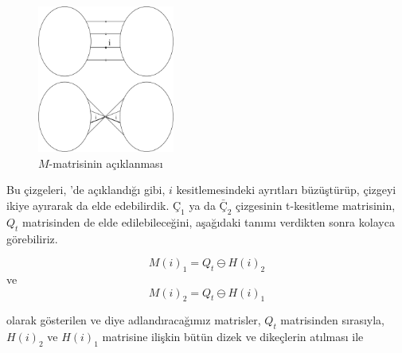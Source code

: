 \documentclass[11pt]{amsbook}
\begin{document}
\begin{figure}[htb]
	\centering
	\includegraphics[width=0.4\textwidth]{images/ceyhun-047-fig01}
	\caption{\( M \)-matrisinin açıklanması}
	\label{fig:mMatrisininAciklanmasi}
\end{figure}

Bu çizgeleri, 'de açıklandığı gibi, \( i \)
kesitlemesindeki ayrıtları büzüştürüp, çizgeyi ikiye ayırarak da elde
edebilirdik. \( Ç_1 \) ya da \( \bar{Ç}_2 \) çizgesinin t-kesitleme
matrisinin, \( Q_t \) matrisinden de elde edilebileceğini, aşağıdaki tanımı
verdikten sonra kolayca görebiliriz.

\begin{definition}
	\[
		{ M(i) }_1 = Q_t \ominus { H(i) }_2
	\]
	ve
	\[
		{ M(i) }_2 = Q_t \ominus { H(i) }_1
	\]

	olarak gösterilen ve  diye adlandıracağımız matrisler,
	\( Q_t \) matrisinden sırasıyla, \( { H(i) }_2 \) ve \( { H(i) }_1 \)
	matrisine ilişkin bütün dizek ve dikeçlerin atılması ile
\end{definition}
\end{document}

